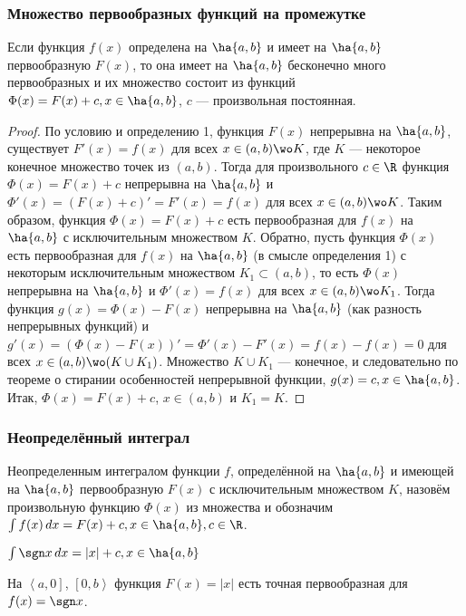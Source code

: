 \documentclass[a4paper]{article}
\begin{document}
\subsubsection{Множество первообразных функций на промежутке}
\begin{theorem}
  Если функция $f(x)$ определена на $\ha{a,b}$ и имеет на $\ha{a,b}$
  первообразную $F(x)$, то она имеет на $\ha{a,b}$ бесконечно много
  первообразных и их множество состоит из функций $\Phi(x)=F(x)+c, x\in
  \ha{a,b}$, $c$ --- произвольная постоянная.
\end{theorem}
\begin{proof}
  По условию и определению 1, функция $F(x)$ непрерывна на $\ha{a,b}$,
  существует $F'(x)=f(x)$ для всех $x\in(a,b)\wo K$, где $K$
  --- некоторое конечное множество точек из $(a,b)$. Тогда для
  произвольного $c\in\R$ функция $\Phi(x)=F(x)+c$ непрерывна на
  $\ha{a,b}$ и $\Phi'(x)=(F(x)+c)'=F'(x)=f(x)$ для всех $x\in(a,b) \wo K$. Таким образом, функция $\Phi(x)=F(x)+c$ есть первообразная
  для $f(x)$ на $\ha{a,b}$ с исключительным множеством $K$. Обратно,
  пусть функция $\Phi(x)$ есть первообразная для $f(x)$ на $\ha{a,b}$
  (в смысле определения 1) с некоторым исключительным множеством
  $K_1\subset(a,b)$, то есть $\Phi(x)$ непрерывна на $\ha{a,b}$ и
  $\Phi'(x)=f(x)$ для всех $x\in(a,b)\wo K_1$. Тогда функция
  $g(x)=\Phi(x)-F(x)$ непрерывна на $\ha{a,b}$ (как разность
  непрерывных функций) и
  $g'(x)=(\Phi(x)-F(x))'=\Phi'(x)-F'(x)=f(x)-f(x)=0$ для всех
  $x\in(a,b)\wo(K\cup K_1)$. Множество $K\cup K_1$ ---
  конечное, и следовательно по теореме о стирании особенностей
  непрерывной функции, $g(x)=c, x\in\ha{a,b}$. Итак,
  $\Phi(x)=F(x)+c$, $x\in(a,b)$ и $K_1=K$. %
\end{proof}

\subsubsection{Неопределённый интеграл}
\begin{df*}
  Неопределенным интегралом функции $f$, определённой на $\ha{a,b}$ и
  имеющей на $\ha{a,b}$ первообразную $F(x)$ с исключительным
  множеством $K$, назовём произвольную функцию $\Phi(x)$ из
  множества  и обозначим $\int
  f(x) \,dx = F(x)+c, x \in \ha{a,b}, c\in\R$.
\end{df*}
$\int \sgn x \,dx=|x|+c, x\in \ha{a,b}$

На $\left<a,0\right]$, $\left[0,b\right>$ функция $F(x)=|x|$ есть
точная первообразная для $f(x)=\sgn x$.
\end{document}
